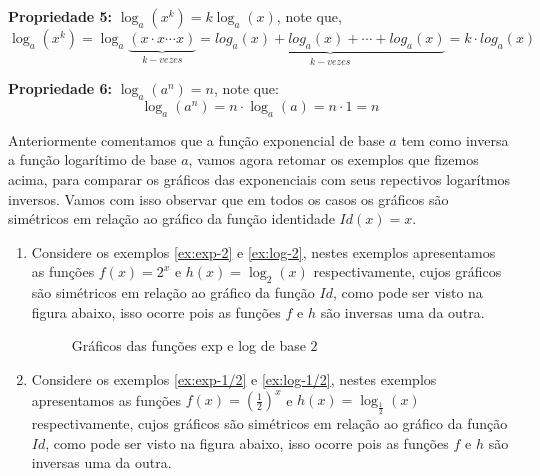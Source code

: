   \textbf{Propriedade 5:} $\log_{a}(x^k)= k \log_{a}(x)$, note que,
  \[\log_{a}(x^k)= \log_{a}\underbrace{(x \cdot x \cdots x)}_{k-vezes}= \underbrace{log_{a}(x) + log_{a}(x)+ \cdots + log_{a}(x)}_{k-vezes}= k \cdot log_{a}(x)\]
  \fim
  
  \textbf{Propriedade 6:} $\log_{a}(a^n)= n$, note que:
  \[\log_{a}(a^n)= n \cdot \log_{a}(a)= n \cdot 1 = n\]
  \fim
  
  Anteriormente comentamos que a função exponencial de base $a$ tem como inversa a função logarítimo de base $a$, vamos agora retomar os exemplos que fizemos acima, para comparar os gráficos das exponenciais com seus repectivos logarítmos inversos. Vamos com isso observar que em todos os casos os gráficos são simétricos em relação ao gráfico da função identidade $Id(x)= x$.
  
  \begin{enumerate}
   \item Considere os exemplos \autoref{ex:exp-2} e \autoref{ex:log-2}, nestes exemplos apresentamos as funções $f(x)= 2^x$ e $h(x)= \log_{2}(x)$ respectivamente, cujos gráficos são simétricos em relação ao gráfico da função $Id$, como pode ser visto na figura abaixo, isso ocorre pois as funções $f$ e $h$ são inversas uma da outra.
   
   \begin{figure}[H]
    \centering
    \caption{Gráficos das funções exp e log de base $2$}
   \end{figure}
   
   \item Considere os exemplos \autoref{ex:exp-1/2} e \autoref{ex:log-1/2}, nestes exemplos apresentamos as funções $f(x)= \left(\frac{1}{2}\right)^x$ e $h(x)= \log_{\frac{1}{2}}(x)$ respectivamente, cujos gráficos são simétricos em relação ao gráfico da função $Id$, como pode ser visto na figura abaixo, isso ocorre pois as funções $f$ e $h$ são inversas uma da outra.
   

\end{enumerate}
